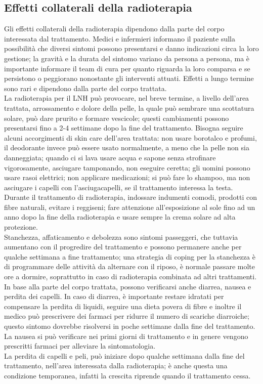 \subsection{Effetti collaterali della radioterapia}
Gli effetti collaterali della radioterapia dipendono dalla parte del corpo interessata dal trattamento. 
Medici e infermieri informano il paziente sulla possibilità che diversi sintomi possono presentarsi e danno indicazioni
circa la loro gestione; la gravità e la durata del sintomo variano da persona a persona, ma è importante informare 
il team di cura per quanto riguarda la loro comparsa e se persistono o peggiorano nonostante gli interventi attuati. 
Effetti a lungo termine sono rari e dipendono dalla parte del corpo trattata\cite{MACMILLAN}.\\

La radioterapia per il LNH può provocare, nel breve termine, a livello dell’area 
trattata, arrossamento e dolore della pelle, la quale può sembrare una scottatura solare, può dare prurito e 
formare vescicole; questi cambiamenti possono presentarsi fino a 2-4 settimane dopo la fine del trattamento. 
Bisogna seguire alcuni accorgimenti di skin care dell’area trattata: 
non usare borotalco e profumi, il deodorante invece può essere usato normalmente, a meno che 
la pelle non sia danneggiata; quando ci si lava usare acqua e sapone senza strofinare vigorosamente, 
asciugare tamponando, non eseguire ceretta; gli uomini possono usare rasoi elettrici; non applicare medicazioni; 
si può fare lo shampoo, ma non asciugare i capelli con l’asciugacapelli, se il trattamento interessa la testa.\\ 
Durante il trattamento di radioterapia, indossare indumenti comodi, prodotti con fibre naturali, evitare i reggiseni; 
fare attenzione all’esposizione al sole fino ad un anno dopo la fine della radioterapia e usare sempre la crema 
solare ad alta protezione\cite{UKRADIOTP}.\\

Stanchezza, affaticamento e debolezza sono sintomi passeggeri, che tuttavia aumentano con il progredire del 
trattamento e possono permanere anche per qualche settimana a fine trattamento; 
una strategia di coping per la stanchezza è di programmare delle attività da alternare con il riposo, 
è normale passare molte ore a dormire, soprattutto in caso di radioterapia combinata 
ad altri trattamenti.\\ 
In base alla parte del corpo trattata, possono verificarsi anche diarrea, nausea e perdita dei capelli. In caso di 
diarrea, è importante restare idratati per compensare la perdita di liquidi, seguire una dieta povera di fibre e 
inoltre il medico può prescrivere dei farmaci per ridurre il numero di scariche diarroiche; questo sintomo dovrebbe 
risolversi in poche settimane dalla fine del trattamento. La nausea si può 
verificare nei primi giorni di trattamento e in genere vengono prescritti farmaci per alleviare 
la sintomatologia.\\ 
La perdita di capelli e peli, può iniziare dopo qualche settimana dalla fine del trattamento, nell’area 
interessata dalla radioterapia; è anche questa una condizione temporanea, infatti la crescita riprende quando il trattamento 
cessa\cite{UKRADIOTP}.

